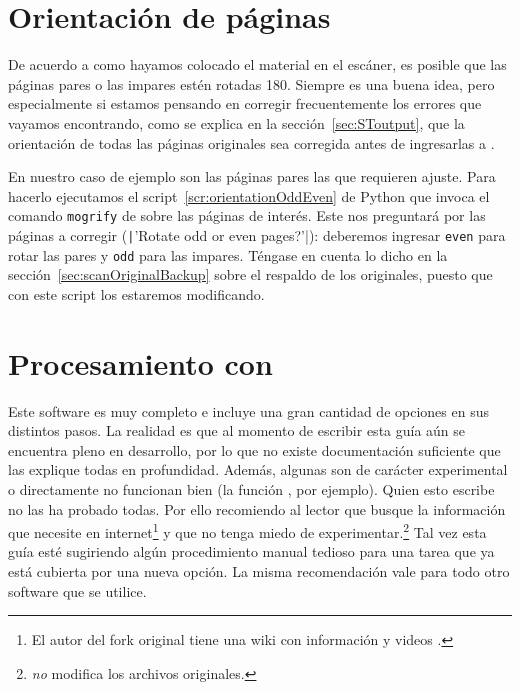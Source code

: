 \documentclass[%
	a5paper,
	10pt,
	twoside,
	openright,
	final,
]{memoir}
\begin{document}
{	\section{Orientación de páginas\label{sec:fixOrientation}} De acuerdo a como hayamos colocado el material en el escáner, es posible que las páginas pares o las impares estén rotadas 180\textdegree. Siempre es una buena idea, pero especialmente si estamos pensando en corregir frecuentemente los errores que vayamos encontrando, como se explica en la sección~\ref{sec:SToutput}, que la orientación de todas las páginas originales sea corregida antes de ingresarlas a \scantailor.

	En nuestro caso de ejemplo son las páginas pares las que requieren ajuste. Para hacerlo ejecutamos el script~\ref{scr:orientationOddEven} de Python que invoca el comando \texttt{mogrify} de \imagemagick sobre las páginas de interés. Este nos preguntará por las páginas a corregir (\texttt|'Rotate odd or even pages?'|): deberemos ingresar \texttt{even} para rotar las pares y \texttt{odd} para las impares. Téngase en cuenta lo dicho en la sección~\ref{sec:scanOriginalBackup} sobre el respaldo de los originales, puesto que con este script los estaremos modificando.


	\section{Procesamiento con \scantailor} Este software es muy completo e incluye una gran cantidad de opciones en sus distintos pasos. La realidad es que al momento de escribir esta guía aún se encuentra pleno en desarrollo, por lo que no existe documentación suficiente que las explique todas en profundidad. Además, algunas son de carácter experimental o directamente no funcionan bien (la función , por ejemplo). Quien esto escribe no las ha probado todas. Por ello recomiendo al lector que busque la información que necesite en internet\footnote{El autor del fork original tiene una wiki con información y videos \cite{ScanTailorWiki}.} y que no tenga miedo de experimentar.\footnote{\scantailor \emph{no} modifica los archivos originales.} Tal vez esta guía esté sugiriendo algún procedimiento manual tedioso para una tarea que ya está cubierta por una nueva opción. La misma recomendación vale para todo otro software que se utilice.

}
\end{document}
